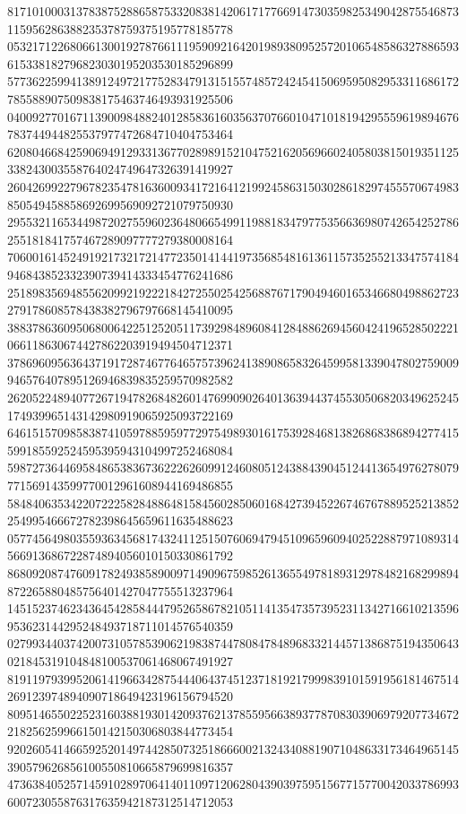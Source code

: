 \begin{DoxyCode}
      817101000313783875288658753320838142061717766914730359825349042875546873115956286388235378759375195778185778
      053217122680661300192787661119590921642019893809525720106548586327886593615338182796823030195203530185296899
      577362259941389124972177528347913151557485724245415069595082953311686172785588907509838175463746493931925506
      040092770167113900984882401285836160356370766010471018194295559619894676783744944825537977472684710404753464
      620804668425906949129331367702898915210475216205696602405803815019351125338243003558764024749647326391419927
      260426992279678235478163600934172164121992458631503028618297455570674983850549458858692699569092721079750930
      295532116534498720275596023648066549911988183479775356636980742654252786255181841757467289097777279380008164
      706001614524919217321721477235014144197356854816136115735255213347574184946843852332390739414333454776241686
      251898356948556209921922218427255025425688767179049460165346680498862723279178608578438382796797668145410095
      388378636095068006422512520511739298489608412848862694560424196528502221066118630674427862203919494504712371
      378696095636437191728746776465757396241389086583264599581339047802759009946576407895126946839835259570982582
      262052248940772671947826848260147699090264013639443745530506820349625245174939965143142980919065925093722169
      646151570985838741059788595977297549893016175392846813826868386894277415599185592524595395943104997252468084
      598727364469584865383673622262609912460805124388439045124413654976278079771569143599770012961608944169486855
      584840635342207222582848864815845602850601684273945226746767889525213852254995466672782398645659611635488623
      057745649803559363456817432411251507606947945109659609402522887971089314566913686722874894056010150330861792
      868092087476091782493858900971490967598526136554978189312978482168299894872265880485756401427047755513237964
      145152374623436454285844479526586782105114135473573952311342716610213596953623144295248493718711014576540359
      027993440374200731057853906219838744780847848968332144571386875194350643021845319104848100537061468067491927
      819119793995206141966342875444064374512371819217999839101591956181467514269123974894090718649423196156794520
      809514655022523160388193014209376213785595663893778708303906979207734672218256259966150142150306803844773454
      920260541466592520149744285073251866600213243408819071048633173464965145390579626856100550810665879699816357
      473638405257145910289706414011097120628043903975951567715770042033786993600723055876317635942187312514712053

\end{DoxyCode}
